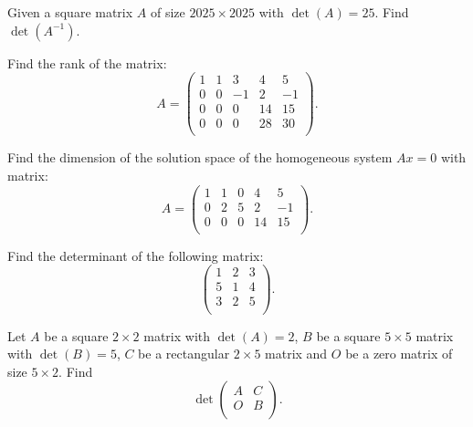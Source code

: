 \begin{problem}
 Given a square matrix $A$ of size $2025 \times 2025$ with $\det(A) = 25$. Find $\det(A^{-1})$.
\end{problem}

\begin{problem}
 Find the rank of the matrix:
$$
A =\begin{pmatrix}
    1 & 1 & 3 & 4 & 5 \\
    0 & 0 & -1 & 2 & -1 \\
    0 & 0 & 0 & 14 & 15 \\
    0 & 0 & 0 & 28 & 30 \\
\end{pmatrix}.
$$
\end{problem}

\begin{problem}
     Find the dimension of the solution space of the homogeneous system $A x = 0$ with matrix:
    $$
    A =\begin{pmatrix}
    1 & 1 & 0 & 4 & 5 \\
    0 & 2 & 5 & 2 & -1 \\
    0 & 0 & 0 & 14 & 15 \\
\end{pmatrix}.
    $$
\end{problem}

\begin{problem}
    Find the determinant of the following matrix:
$$
\begin{pmatrix}
    1 & 2 & 3 \\
    5 & 1 & 4 \\
    3 & 2 & 5 \\
\end{pmatrix}.
$$
\end{problem}

\begin{problem}
Let $A$ be a square $2 \times 2$ matrix with $\det(A) = 2$, $B$ be a square $5 \times 5$ matrix with $\det(B) = 5$, $C$ be a rectangular $2 \times 5$ matrix and $O$ be a zero matrix of size $5 \times 2$.
Find 
$$
\det\begin{pmatrix}
    A & C \\
    O & B \\
\end{pmatrix}.
$$
\end{problem}

